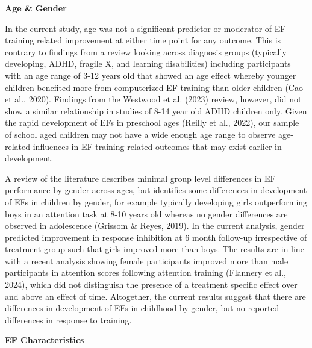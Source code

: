 \documentclass[
  letterpaper,
]{ut-thesis}
\begin{document}
\textbf{Age \& Gender}

In the current study, age was not a significant predictor or moderator
of EF training related improvement at either time point for any outcome.
This is contrary to findings from a review looking across diagnosis
groups (typically developing, ADHD, fragile X, and learning
disabilities) including participants with an age range of 3-12 years old
that showed an age effect whereby younger children benefited more from
computerized EF training than older children (Cao et al., 2020).
Findings from the Westwood et al. (2023) review, however, did not show a
similar relationship in studies of 8-14 year old ADHD children only.
Given the rapid development of EFs in preschool ages (Reilly et al.,
2022), our sample of school aged children may not have a wide enough age
range to observe age-related influences in EF training related outcomes
that may exist earlier in development.

A review of the literature describes minimal group level differences in
EF performance by gender across ages, but identifies some differences in
development of EFs in children by gender, for example typically
developing girls outperforming boys in an attention task at 8-10 years
old whereas no gender differences are observed in adolescence (Grissom
\& Reyes, 2019). In the current analysis, gender predicted improvement
in response inhibition at 6 month follow-up irrespective of treatment
group such that girls improved more than boys. The results are in line
with a recent analysis showing female participants improved more than
male participants in attention scores following attention training
(Flannery et al., 2024), which did not distinguish the presence of a
treatment specific effect over and above an effect of time. Altogether,
the current results suggest that there are differences in development of
EFs in childhood by gender, but no reported differences in response to
training.

\textbf{EF Characteristics}
\end{document}

